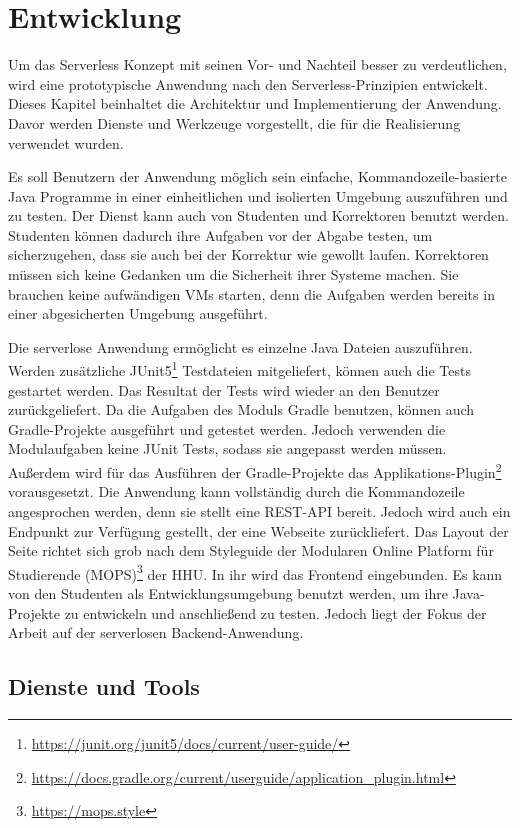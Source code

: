 \chapter{Entwicklung}
Um das Serverless Konzept mit seinen Vor- und Nachteil
besser zu verdeutlichen, wird eine prototypische Anwendung nach den Serverless-Prinzipien
entwickelt. Dieses Kapitel beinhaltet die Architektur und Implementierung
der Anwendung. Davor werden Dienste und Werkzeuge vorgestellt,
die für die Realisierung verwendet wurden.

Es soll Benutzern der Anwendung möglich sein einfache, Kommandozeile-basierte
Java Programme in einer einheitlichen und isolierten Umgebung
auszuführen und zu testen. Der Dienst kann auch von Studenten und
Korrektoren benutzt werden.
Studenten können dadurch ihre Aufgaben vor der Abgabe testen, um sicherzugehen,
dass sie auch bei der Korrektur wie gewollt laufen.
Korrektoren müssen sich keine Gedanken um die Sicherheit ihrer Systeme
machen. Sie brauchen keine aufwändigen VMs starten, denn die Aufgaben werden
bereits in einer abgesicherten Umgebung ausgeführt.

Die serverlose Anwendung ermöglicht es einzelne Java Dateien auszuführen.
Werden zusätzliche JUnit5\footnote{\url{https://junit.org/junit5/docs/current/user-guide/}}
Testdateien mitgeliefert, können auch die Tests gestartet werden.
Das Resultat der Tests wird wieder an den Benutzer zurückgeliefert.
Da die Aufgaben des Moduls Gradle benutzen,
können auch Gradle-Projekte ausgeführt und getestet werden.
Jedoch verwenden die Modulaufgaben keine JUnit Tests, sodass sie angepasst werden müssen.
Außerdem wird für das Ausführen der Gradle-Projekte
das Applikations-Plugin\footnote{\url{https://docs.gradle.org/current/userguide/application_plugin.html}}
vorausgesetzt. Die Anwendung kann vollständig durch die Kommandozeile angesprochen werden, denn
sie stellt eine REST-API bereit.
Jedoch wird auch ein Endpunkt zur Verfügung gestellt, der eine Webseite zurückliefert.
Das Layout der Seite richtet sich grob nach dem Styleguide der
Modularen Online Platform für Studierende (MOPS)\footnote{\url{https://mops.style}}
der HHU. In ihr wird das Frontend eingebunden.
Es kann von den Studenten als Entwicklungsumgebung benutzt werden, um
ihre Java-Projekte zu entwickeln und anschließend zu testen.
Jedoch liegt der Fokus der Arbeit auf der serverlosen Backend-Anwendung.


\section{Dienste und Tools}
